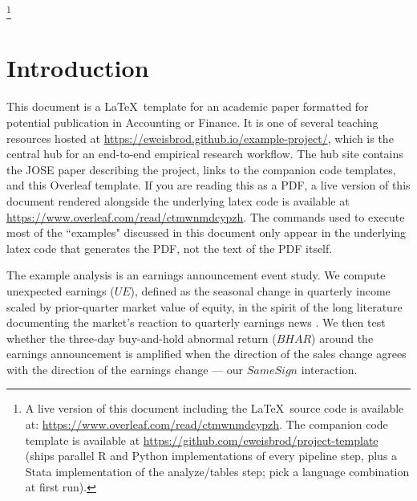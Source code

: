 \documentclass[english,12pt]{article}
\newcommand\blfootnote[1]{%
  \begingroup
  \renewcommand\thefootnote{}\footnote{#1}%
  \addtocounter{footnote}{-1}%
  \endgroup
}
\begin{document}
\blfootnote{A live version of this document including the \LaTeX\ source code is available at: \url{https://www.overleaf.com/read/ctmwnmdcypzh}. The companion code template is available at \url{https://github.com/eweisbrod/project-template} (ships parallel R and Python implementations of every pipeline step, plus a Stata implementation of the analyze/tables step; pick a language combination at first run).}

\thispagestyle{empty}
\clearpage\newpage
\setcounter{secnumdepth}{3}
\setcounter{tocdepth}{3}


\section{Introduction} \label{section-intro}
\vspace{-0.1in}

This document is a \LaTeX\ template for an academic paper formatted for potential publication in Accounting or Finance. It is one of several teaching resources hosted at \url{https://eweisbrod.github.io/example-project/}, which is the central hub for an end-to-end empirical research workflow. The hub site contains the JOSE paper describing the project, links to the companion code templates, and this Overleaf template. If you are reading this as a PDF, a live version of this document rendered alongside the underlying latex code is available at \url{https://www.overleaf.com/read/ctmwnmdcypzh}. The commands used to execute most of the ``examples" discussed in this document only appear in the underlying latex code that generates the PDF, not the text of the PDF itself. 

The example analysis is an earnings announcement event study. We compute unexpected earnings ($UE$), defined as the seasonal change in quarterly income scaled by prior-quarter market value of equity, in the spirit of the long literature documenting the market's reaction to quarterly earnings news \citep{ball1968empirical,beaver1968information,bernard1989post}. We then test whether the three-day buy-and-hold abnormal return ($BHAR$) around the earnings announcement is amplified when the direction of the sales change agrees with the direction of the earnings change --- our $SameSign$ interaction.
\end{document}
